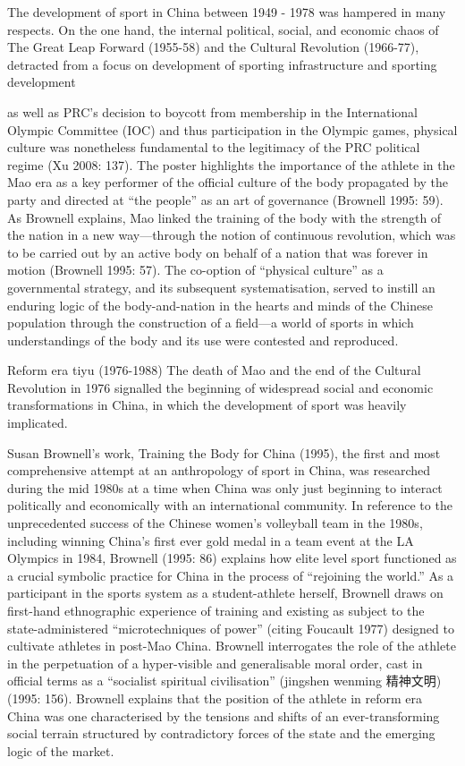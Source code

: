 The development of sport in China between 1949 - 1978 was hampered in many respects.  On the one hand, the internal political, social, and economic chaos of The Great Leap Forward (1955-58) and the Cultural Revolution (1966-77), detracted from a focus on development of sporting infrastructure and sporting development


as well as PRC's decision to boycott  from membership in the International Olympic Committee (IOC) and thus participation in the Olympic games, physical culture was nonetheless fundamental to the legitimacy of the PRC political regime (Xu 2008: 137).   The poster highlights the importance of the athlete in the Mao era as a key performer of the official culture of the body propagated by the party and directed at “the people” as an art of governance (Brownell 1995: 59).  As Brownell explains,
Mao linked the training of the body with the strength of the nation in a new way—through the notion of continuous revolution, which was to be carried out by an active body on behalf of a nation that was forever in motion (Brownell 1995: 57).
The co-option of “physical culture” as a governmental strategy, and its subsequent systematisation, served to instill an enduring logic of the body-and-nation in the hearts and minds of the Chinese population through the construction of a field—a world of sports in which understandings of the body and its use were contested and reproduced.





Reform era tiyu (1976-1988)
The death of Mao and the end of the Cultural Revolution in 1976 signalled the beginning of widespread social and economic transformations in China, in which the development of sport was heavily implicated.

Susan Brownell’s work, Training the Body for China (1995), the first and most comprehensive attempt at an anthropology of sport in China, was researched during the mid 1980s at a time when China was only just beginning to interact politically and economically with an international community.  In reference to the unprecedented success of the Chinese women’s volleyball team in the 1980s, including winning China's first ever gold medal in a team event at the LA Olympics in 1984, Brownell (1995: 86) explains how elite level sport functioned as a crucial symbolic practice for China in the process of ``rejoining the world.''  As a participant in the sports system as a student-athlete herself, Brownell draws on first-hand ethnographic experience of training and existing as subject to the state-administered ``microtechniques of power'' (citing Foucault 1977) designed to cultivate athletes in post-Mao China.  Brownell interrogates the role of the athlete in the perpetuation of a hyper-visible and generalisable moral order, cast in official terms as a ``socialist spiritual civilisation'' (jingshen wenming 精神文明) (1995: 156).  Brownell explains that the position of the athlete in reform era China was one characterised by the tensions and shifts of an ever-transforming social terrain structured by contradictory forces of the state and the emerging logic of the market.

